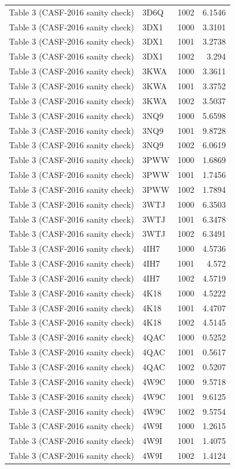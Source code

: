 \begin{longtable}{llrr}
Table 3 (CASF-2016 sanity check) & 3D6Q & 1002 & 6.1546 \\
Table 3 (CASF-2016 sanity check) & 3DX1 & 1000 & 3.3101 \\
Table 3 (CASF-2016 sanity check) & 3DX1 & 1001 & 3.2738 \\
Table 3 (CASF-2016 sanity check) & 3DX1 & 1002 & 3.294 \\
Table 3 (CASF-2016 sanity check) & 3KWA & 1000 & 3.3611 \\
Table 3 (CASF-2016 sanity check) & 3KWA & 1001 & 3.3752 \\
Table 3 (CASF-2016 sanity check) & 3KWA & 1002 & 3.5037 \\
Table 3 (CASF-2016 sanity check) & 3NQ9 & 1000 & 5.6598 \\
Table 3 (CASF-2016 sanity check) & 3NQ9 & 1001 & 9.8728 \\
Table 3 (CASF-2016 sanity check) & 3NQ9 & 1002 & 6.0619 \\
Table 3 (CASF-2016 sanity check) & 3PWW & 1000 & 1.6869 \\
Table 3 (CASF-2016 sanity check) & 3PWW & 1001 & 1.7456 \\
Table 3 (CASF-2016 sanity check) & 3PWW & 1002 & 1.7894 \\
Table 3 (CASF-2016 sanity check) & 3WTJ & 1000 & 6.3503 \\
Table 3 (CASF-2016 sanity check) & 3WTJ & 1001 & 6.3478 \\
Table 3 (CASF-2016 sanity check) & 3WTJ & 1002 & 6.3491 \\
Table 3 (CASF-2016 sanity check) & 4IH7 & 1000 & 4.5736 \\
Table 3 (CASF-2016 sanity check) & 4IH7 & 1001 & 4.572 \\
Table 3 (CASF-2016 sanity check) & 4IH7 & 1002 & 4.5719 \\
Table 3 (CASF-2016 sanity check) & 4K18 & 1000 & 4.5222 \\
Table 3 (CASF-2016 sanity check) & 4K18 & 1001 & 4.4707 \\
Table 3 (CASF-2016 sanity check) & 4K18 & 1002 & 4.5145 \\
Table 3 (CASF-2016 sanity check) & 4QAC & 1000 & 0.5252 \\
Table 3 (CASF-2016 sanity check) & 4QAC & 1001 & 0.5617 \\
Table 3 (CASF-2016 sanity check) & 4QAC & 1002 & 0.5207 \\
Table 3 (CASF-2016 sanity check) & 4W9C & 1000 & 9.5718 \\
Table 3 (CASF-2016 sanity check) & 4W9C & 1001 & 9.6125 \\
Table 3 (CASF-2016 sanity check) & 4W9C & 1002 & 9.5754 \\
Table 3 (CASF-2016 sanity check) & 4W9I & 1000 & 1.2615 \\
Table 3 (CASF-2016 sanity check) & 4W9I & 1001 & 1.4075 \\
Table 3 (CASF-2016 sanity check) & 4W9I & 1002 & 1.4124 \\
\bottomrule
\end{longtable}
